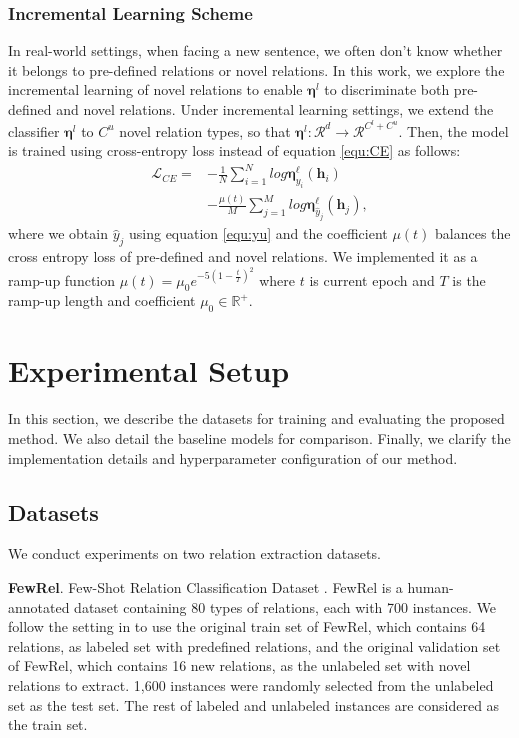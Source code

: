 \documentclass[11pt]{article}
\begin{document}
    \subsubsection{Incremental Learning Scheme} In real-world settings, when facing a new sentence, we often don't know whether it belongs to pre-defined relations or novel relations. In this work, we explore the incremental learning of novel relations to enable $\bm{\eta}^l$ to discriminate both pre-defined and novel relations. Under incremental learning settings, we extend the classifier $\bm{\eta}^l$ to $C^u$ novel relation types, so that $\bm{\eta}^l:\mathcal{R}^d\rightarrow\mathcal{R}^{C^l+C^u}$. Then, the model is trained using cross-entropy loss instead of equation \ref{equ:CE} as follows:
            \begin{equation}
               \begin{aligned} \mathcal{L}_{CE}=&-\frac{1}{N}\sum_{i=1}^{N}log\bm{\eta}^\ell_{y_i}(\bm{h}_i)\\&-\frac{\mu(t)}{M}\sum_{j=1}^{M}log\bm{\eta}^\ell_{\hat{y}_j}(\bm{h}_j),
               \end{aligned}
            \end{equation}
    where we obtain $\hat{y}_j$ using equation \ref{equ:yu} and the coefficient $\mu(t)$ balances the cross entropy loss of pre-defined and novel relations. We implemented it as a ramp-up function $\mu(t)=\mu_0e^{-5(1-\frac{t}{T})^2}$ where $t$ is current epoch and $T$ is the ramp-up length and coefficient $\mu_0\in \mathbb{R}^+$.



\section{Experimental Setup}
    \label{sec:exp_setup}
    In this section, we describe the datasets for training and evaluating the proposed method. We also detail the baseline models
for comparison.  Finally, we clarify the implementation details and hyperparameter configuration of our method.
    \subsection{Datasets}
        We conduct experiments on two relation extraction datasets.
        
        \noindent\textbf{FewRel}. Few-Shot Relation Classification Dataset \citep{han-etal-2018-fewrel}. FewRel is a human-annotated dataset containing 80 types of relations, each with 700 instances. We follow the setting in \citep{wu-etal-2019-open} to use the original train set of FewRel, which contains 64 relations, as labeled set with predefined relations, and the original validation set of FewRel, which contains 16 new relations, as the unlabeled set with novel relations to extract. 1,600 instances were randomly selected from the unlabeled set as the test set. The rest of labeled and unlabeled instances are considered as the train set.
        
\end{document}
